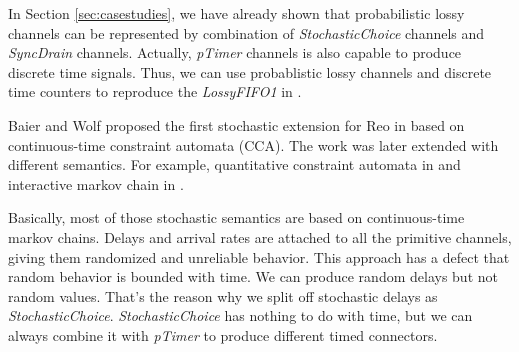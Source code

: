 In Section \ref{sec:casestudies}, we have already shown that probabilistic lossy channels can be represented by combination of \emph{StochasticChoice} channels and \emph{SyncDrain} channels. Actually, \emph{pTimer} channels is also capable to produce discrete time signals. Thus, we can use probablistic lossy channels and discrete time counters to reproduce the \emph{LossyFIFO1} in \cite{Models2005}.


\vspace{0.5em}
 Baier and Wolf proposed the first stochastic extension for Reo in \cite{Baier2006} based on continuous-time constraint automata (CCA). The work was later extended with different semantics. For example, quantitative constraint automata in \cite{Arbab2009} and interactive markov chain in \cite{Oliveira2016}.

Basically, most of those stochastic semantics are based on continuous-time markov chains. Delays and arrival rates are attached to all the primitive channels, giving them randomized and unreliable behavior. This approach has a defect that random behavior is bounded with time. We can produce random delays but not random values. That's the reason why we split off stochastic delays as \emph{StochasticChoice}. \emph{StochasticChoice} has nothing to do with time, but we can always combine it with \emph{pTimer} to produce different timed connectors.





        

